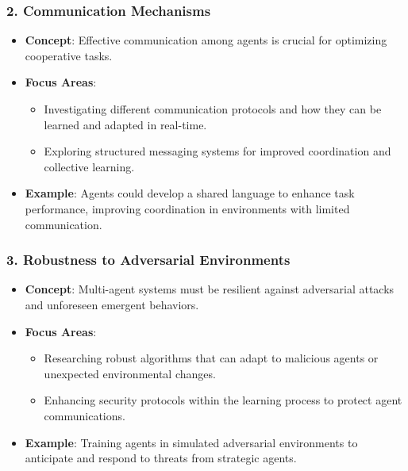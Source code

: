 \documentclass[aspectratio=169]{beamer}
\begin{document}
\begin{frame}[fragile]
    \frametitle{2. Communication Mechanisms}
    \begin{itemize}
        \item \textbf{Concept}: Effective communication among agents is crucial for optimizing cooperative tasks.
        \item \textbf{Focus Areas}:
        \begin{itemize}
            \item Investigating different communication protocols and how they can be learned and adapted in real-time.
            \item Exploring structured messaging systems for improved coordination and collective learning.
        \end{itemize}
        \item \textbf{Example}: Agents could develop a shared language to enhance task performance, improving coordination in environments with limited communication.
    \end{itemize}
\end{frame}

\begin{frame}[fragile]
    \frametitle{3. Robustness to Adversarial Environments}
    \begin{itemize}
        \item \textbf{Concept}: Multi-agent systems must be resilient against adversarial attacks and unforeseen emergent behaviors.
        \item \textbf{Focus Areas}:
        \begin{itemize}
            \item Researching robust algorithms that can adapt to malicious agents or unexpected environmental changes.
            \item Enhancing security protocols within the learning process to protect agent communications.
        \end{itemize}
        \item \textbf{Example}: Training agents in simulated adversarial environments to anticipate and respond to threats from strategic agents.
    \end{itemize}
\end{frame}
\end{document}
